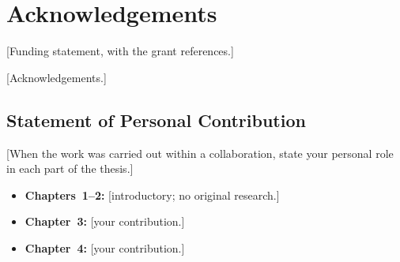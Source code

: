 \chapter*{Acknowledgements}

[Funding statement, with the grant references.]

[Acknowledgements.]

\section*{Statement of Personal Contribution}

[When the work was carried out within a collaboration, state your personal role in each part of the thesis.]

\begin{itemize}
    \item \textbf{Chapters~1--2:} [introductory; no original research.]
    \item \textbf{Chapter~3:} [your contribution.]
    \item \textbf{Chapter~4:} [your contribution.]
\end{itemize}

\cleardoublepage
